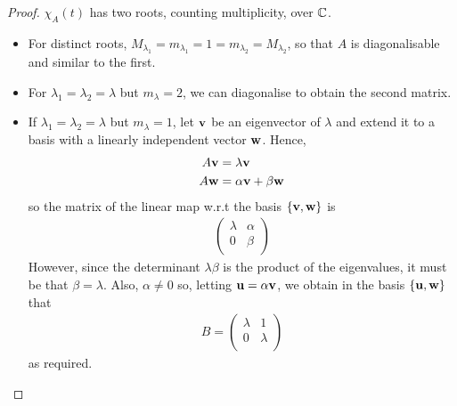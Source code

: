 \documentclass{../template/note}
\begin{document}
    \begin{proof}
        \(\chi_A(t)\) has two roots, counting multiplicity, over \(\mathbb C\).
        \begin{itemize}
            \item For distinct roots, \(M_{\lambda_1} = m_{\lambda_1} = 1 = m_{\lambda_2} = M_{\lambda_2}\), so that \(A\) is diagonalisable and similar to the first.
            \item For \(\lambda_1 = \lambda_2 = \lambda\) but \(m_\lambda = 2\), we can diagonalise to obtain the second matrix.
            \item If \(\lambda_1 = \lambda_2 = \lambda\) but \(m_\lambda = 1\), let \(\V v\) be an eigenvector of \(\lambda\) and extend it to a basis with a linearly independent vector \(\V w\). Hence,
            \begin{align*}
                A\V v &= \lambda \V v \\
                A \V w &= \alpha \V v + \beta \V w
            \end{align*}
            so the matrix of the linear map w.r.t the basis \(\{\V v, \V w\}\) is
            \begin{align*}
                \begin{pmatrix}
                    \lambda & \alpha \\
                    0 & \beta \\
                \end{pmatrix}
            \end{align*}
            However, since the determinant \(\lambda\beta\) is the product of the eigenvalues, it must be that \(\beta = \lambda\). Also, \(\alpha \neq 0\) so, letting \(\V u = \alpha \V v\), we obtain in the basis \(\{\V u, \V w\}\) that
            \begin{align*}
                B = \begin{pmatrix}
                    \lambda & 1 \\
                    0 & \lambda \\
                \end{pmatrix}
            \end{align*}
            as required.           
        \end{itemize}        
    \end{proof}
    
\end{document}
